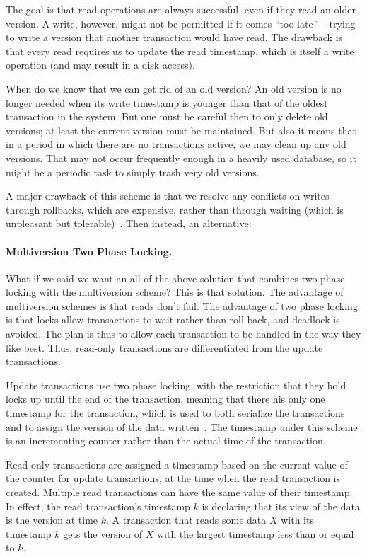The goal is that read operations are always successful, even if they read an older version. A write, however, might not be permitted if it comes ``too late'' -- trying to write a version that another transaction would have read. The drawback is that every read requires us to update the read timestamp, which is itself a write operation (and may result in a disk access).

When do we know that we can get rid of an old version? An old version is no longer needed when its write timestamp is younger than that of the oldest transaction in the system. But one must be careful then to only delete old versions; at least the current version must be maintained. But also it means that in a period in which there are no transactions active, we may clean up any old versions. That may not occur frequently enough in a heavily used database, so it might be a periodic task to simply trash very old versions.

A major drawback of this scheme is that we resolve any conflicts on writes through rollbacks, which are expensive, rather than through waiting (which is unpleasant but tolerable)~\cite{dsc}. Then instead, an alternative:

\paragraph{Multiversion Two Phase Locking.} What if we said we want an all-of-the-above solution that combines two phase locking with the multiversion scheme? This is that solution. The advantage of multiversion schemes is that reads don't fail. The advantage of two phase locking is that locks allow transactions to wait rather than roll back, and deadlock is avoided. The plan is thus to allow each transaction to be handled in the way they like best. Thus, read-only transactions are differentiated from the update transactions.

Update transactions use two phase locking, with the restriction that they hold locks up until the end of the transaction, meaning that there his only one timestamp for the transaction, which is used to both serialize the transactions and to assign the version of the data written~\cite{dsc}. The timestamp under this scheme is an incrementing counter rather than the actual time of the transaction. 

Read-only transactions are assigned a timestamp based on the current value of the counter for update transactions, at the time when the read transaction is created. Multiple read transactions can have the same value of their timestamp. In effect, the read transaction's timestamp $k$ is declaring that its view of the data is the version at time $k$. A transaction that reads some data $X$ with its timestamp $k$ gets the version of $X$ with the largest timestamp less than or equal to $k$. 

